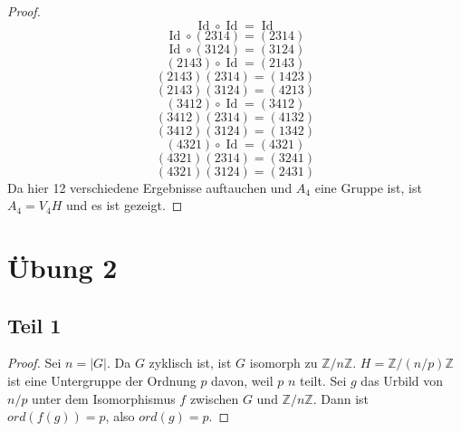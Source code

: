 \documentclass[10pt,a4paper]{article}
\DeclareMathOperator{\Id}{Id}
\begin{document}
\begin{proof}
  \begin{equation}
    \Id \circ \Id = \Id
  \end{equation}
  \begin{equation}
    \Id \circ (2314) = (2314)
  \end{equation}
  \begin{equation}
    \Id \circ (3124) = (3124)
  \end{equation}
  \begin{equation}
    (2143) \circ \Id = (2143)
  \end{equation}
  \begin{equation}
    (2143)(2314) = (1423)
  \end{equation}
  \begin{equation}
    (2143)(3124) = (4213)
  \end{equation}
  \begin{equation}
    (3412) \circ \Id = (3412)
  \end{equation}
  \begin{equation}
    (3412)(2314) = (4132)
  \end{equation}
  \begin{equation}
    (3412)(3124) = (1342)
  \end{equation}
  \begin{equation}
    (4321) \circ \Id = (4321)
  \end{equation}
  \begin{equation}
    (4321)(2314) = (3241)
  \end{equation}
  \begin{equation}
    (4321)(3124) = (2431)
  \end{equation}
  Da hier 12 verschiedene Ergebnisse auftauchen und $A_{4}$ eine Gruppe ist, ist $A_{4} = V_{4}H$ und es ist gezeigt.
\end{proof}

\section{Übung 2}

\subsection{Teil 1}

\begin{proof}
  Sei $n = |G|$.
  Da $G$ zyklisch ist, ist $G$ isomorph zu $\mathbb{Z} / n \mathbb{Z}$.
  $H = \mathbb{Z} / (n / p) \mathbb{Z}$ ist eine Untergruppe der Ordnung $p$ davon, weil $p$ $n$ teilt.
  Sei $g$ das Urbild von $n / p$ unter dem Isomorphismus $f$ zwischen $G$ und $\mathbb{Z} / n \mathbb{Z}$.
  Dann ist $ord(f(g)) = p$, also $ord(g) = p$.
\end{proof}
\end{document}

